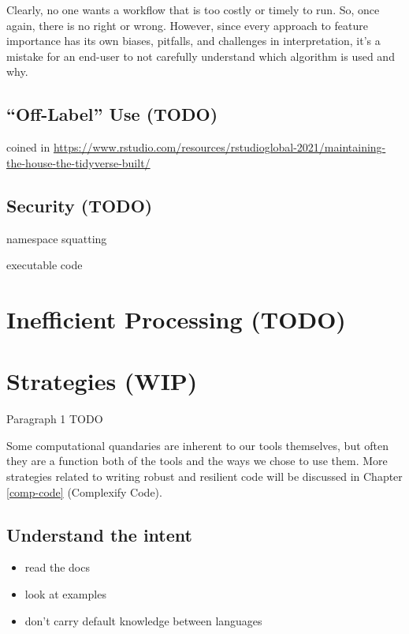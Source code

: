 \documentclass[
]{krantz}
\providecommand{\tightlist}{%
  \setlength{\itemsep}{0pt}\setlength{\parskip}{0pt}}
\begin{document}
Clearly, no one wants a workflow that is too costly or timely to run. So, once again, there is no right or wrong. However, since every approach to feature importance has its own biases, pitfalls, and challenges in interpretation, it's a mistake for an end-user to not carefully understand which algorithm is used and why.

\hypertarget{off-label-use-todo}{%
\subsection{``Off-Label'' Use (TODO)}\label{off-label-use-todo}}

coined in \url{https://www.rstudio.com/resources/rstudioglobal-2021/maintaining-the-house-the-tidyverse-built/}

\hypertarget{security-todo}{%
\subsection{Security (TODO)}\label{security-todo}}

namespace squatting

executable code

\hypertarget{inefficient-processing-todo}{%
\section{Inefficient Processing (TODO)}\label{inefficient-processing-todo}}

\hypertarget{strategies-wip}{%
\section{Strategies (WIP)}\label{strategies-wip}}

Paragraph 1 TODO

Some computational quandaries are inherent to our tools themselves, but often they are a function both of the tools and the ways we chose to use them. More strategies related to writing robust and resilient code will be discussed in Chapter \ref{comp-code} (Complexify Code).

\hypertarget{understand-the-intent-1}{%
\subsection{Understand the intent}\label{understand-the-intent-1}}

\begin{itemize}
\tightlist
\item
  read the docs
\item
  look at examples
\item
  don't carry default knowledge between languages
\end{itemize}
\end{document}
